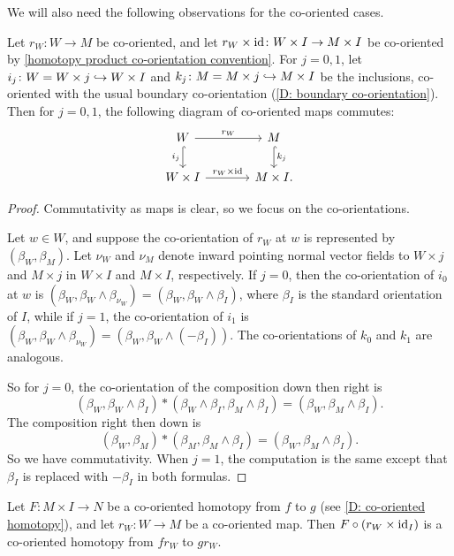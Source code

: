 We will also need the following observations for the co-oriented cases.

\begin{lemma}
	Let $r_W \colon W \to M$ be co-oriented, and let $r_W \times \mathrm{id} \colon W \times I \to M \times I$ be co-oriented by \cref{homotopy product co-orientation convention}.
	For $j = 0,1$, let $i_j \colon W = W \times j \hookrightarrow W \times I$ and $k_j \colon M = M \times j \hookrightarrow M \times I$ be the inclusions, co-oriented with the usual boundary co-orientation (\cref{D: boundary co-orientation}).
	Then for $j = 0,1$, the following diagram of co-oriented maps commutes:
	\[
	\begin{tikzcd}[column sep=large]
		W \arrow[r, "r_W"] \arrow[hookrightarrow,d, "i_j"'] & M \arrow[hookrightarrow,d, "k_j"] \\
		W \times I \arrow[r, "r_W \times \id"] & M \times I.
	\end{tikzcd}
	\]
\end{lemma}

\begin{proof}
	Commutativity as maps is clear, so we focus on the co-orientations.

	Let $w \in W$, and suppose the co-orientation of $r_W$ at $w$ is represented by $(\beta_W, \beta_M)$.
	Let $\nu_W$ and $\nu_M$ denote inward pointing normal vector fields to $W \times j$ and $M \times j$ in $W \times I$ and $M \times I$, respectively. If $j=0$, then the co-orientation of $i_0$ at $w$ is $(\beta_W, \beta_W \wedge \beta_{\nu_W}) = (\beta_W, \beta_W \wedge \beta_I)$, where $\beta_I$ is the standard orientation of $I$, while if $j=1$, the co-orientation of $i_1$ is $(\beta_W, \beta_W \wedge \beta_{\nu_W}) = (\beta_W, \beta_W \wedge (-\beta_I))$. The co-orientations of $k_0$ and $k_1$ are analogous.

	So for $j=0$, the co-orientation of the composition down then right is $$(\beta_W, \beta_W \wedge \beta_I) * (\beta_W \wedge \beta_I, \beta_M \wedge \beta_I) = (\beta_W, \beta_M \wedge \beta_I).$$
	The composition right then down is $$(\beta_W, \beta_M) * (\beta_M, \beta_M \wedge \beta_I) = (\beta_W , \beta_M \wedge \beta_I).$$
	So we have commutativity.
	When $j=1$, the computation is the same except that $\beta_I$ is replaced with $-\beta_I$ in both formulas.
\end{proof}

\begin{corollary}\label{C: universal homotopy boundary co-orientation}
	Let $F \colon M \times I \to N$ be a co-oriented homotopy from $f$ to $g$ (see \cref{D: co-oriented homotopy}), and let $r_W \colon W \to M$ be a co-oriented map.
	Then $F \circ (r_W \times \mathrm{id}_I)$ is a co-oriented homotopy from $fr_W$ to $gr_W$.
\end{corollary}

